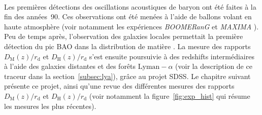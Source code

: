 \paragraph{}
Les premières détections des oscillations acoustiques de baryon ont été faites à la fin des années~90. Ces observations ont été menées à l'aide de ballons volant en haute atmosphère (voir notamment les expériences \emph{BOOMERanG} \autocite{Masi2002} et \emph{MAXIMA} \autocite{Hanany2000}).
Peu de temps après, l'observation des galaxies locales permettait la première détection du pic BAO dans la distribution de matière \autocite{Eisenstein2005}.
La mesure des rapports  $D_{\mathrm{M}}(z) / r_{\mathrm{d}}$ et $D_{\mathrm{H}}(z) / r_{\mathrm{d}}$ s'est ensuite poursuivie à des redshifts intermédiaires à l'aide des galaxies distantes et des forêts $\mathrm{Lyman-}\alpha$ (voir la description de ce traceur dans la section~\ref{subsec:lya}), grâce au projet SDSS. Le chapitre suivant présente ce projet, ainsi qu'une revue des différentes mesures des rapports  $D_{\mathrm{M}}(z) / r_{\mathrm{d}}$ et $D_{\mathrm{H}}(z) / r_{\mathrm{d}}$ (voir notamment la figure~\ref{fig:exp_hist} qui résume les mesures les plus récentes).


